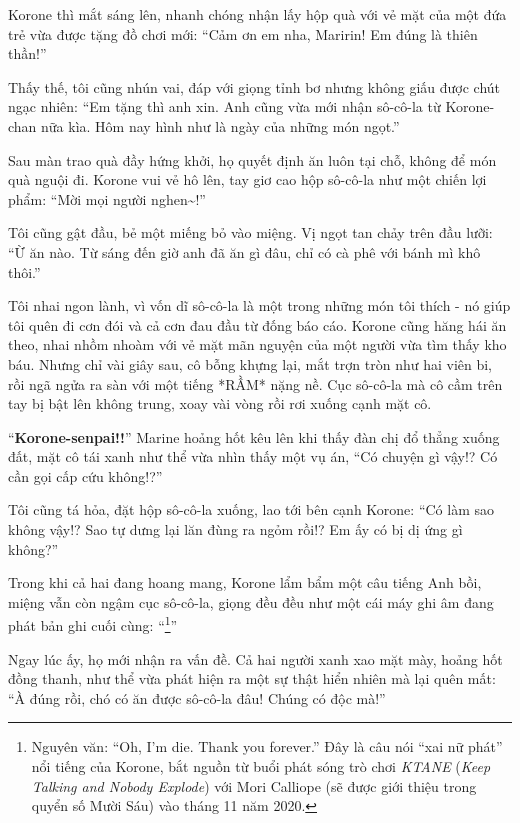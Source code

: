 \documentclass[../main.tex]{subfiles}
\begin{document}
Korone thì mắt sáng lên, nhanh chóng nhận lấy hộp quà với vẻ mặt của một đứa trẻ vừa được tặng đồ chơi mới: ``Cảm ơn em nha, Maririn! Em đúng là thiên thần!''

Thấy thế, tôi cũng nhún vai, đáp với giọng tỉnh bơ nhưng không giấu được chút ngạc nhiên: ``Em tặng thì anh xin. Anh cũng vừa mới nhận sô-cô-la từ Korone-chan nữa kìa. Hôm nay hình như là ngày của những món ngọt.''

Sau màn trao quà đầy hứng khởi, họ quyết định ăn luôn tại chỗ, không để món quà nguội đi. Korone vui vẻ hô lên, tay giơ cao hộp sô-cô-la như một chiến lợi phẩm: ``Mời mọi người nghen\~{}!''

Tôi cũng gật đầu, bẻ một miếng bỏ vào miệng. Vị ngọt tan chảy trên đầu lưỡi: ``Ừ ăn nào. Từ sáng đến giờ anh đã ăn gì đâu, chỉ có cà phê với bánh mì khô thôi.''

Tôi nhai ngon lành, vì vốn dĩ sô-cô-la là một trong những món tôi thích - nó giúp tôi quên đi cơn đói và cả cơn đau đầu từ đống báo cáo. Korone cũng hăng hái ăn theo, nhai nhồm nhoàm với vẻ mặt mãn nguyện của một người vừa tìm thấy kho báu. Nhưng chỉ vài giây sau, cô bỗng khựng lại, mắt trợn tròn như hai viên bi, rồi ngã ngửa ra sàn với một tiếng *RẦM* nặng nề. Cục sô-cô-la mà cô cầm trên tay bị bật lên không trung, xoay vài vòng rồi rơi xuống cạnh mặt cô.

``\textbf{Korone-senpai!!}'' Marine hoảng hốt kêu lên khi thấy đàn chị đổ thẳng xuống đất, mặt cô tái xanh như thể vừa nhìn thấy một vụ án, ``Có chuyện gì vậy!? Có cần gọi cấp cứu không!?''

Tôi cũng tá hỏa, đặt hộp sô-cô-la xuống, lao tới bên cạnh Korone: ``Có làm sao không vậy!? Sao tự dưng lại lăn đùng ra ngỏm rồi!? Em ấy có bị dị ứng gì không?''

Trong khi cả hai đang hoang mang, Korone lẩm bẩm một câu tiếng Anh bồi, miệng vẫn còn ngậm cục sô-cô-la, giọng đều đều như một cái máy ghi âm đang phát bản ghi cuối cùng: ``\footnote{Nguyên văn: ``Oh, I'm die. Thank you forever.'' Đây là câu nói ``xai nữ phát'' nổi tiếng của Korone, bắt nguồn từ buổi phát sóng trò chơi \textit{KTANE} (\textit{Keep Talking and Nobody Explode}) với Mori Calliope (sẽ được giới thiệu trong quyển số Mười Sáu) vào tháng 11 năm 2020.}''


Ngay lúc ấy, họ mới nhận ra vấn đề. Cả hai người xanh xao mặt mày, hoảng hốt đồng thanh, như thể vừa phát hiện ra một sự thật hiển nhiên mà lại quên mất: ``À đúng rồi, chó có ăn được sô-cô-la đâu! Chúng có độc mà!''
\end{document}

